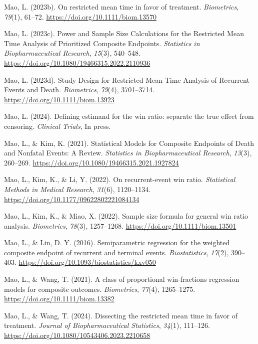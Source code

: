 \documentclass[
  letterpaper,
  DIV=11,
  numbers=noendperiod]{scrreprt}
\newlength{\cslhangindent}
\newlength{\cslentryspacingunit} %
\newenvironment{CSLReferences}[2] %
 {%
  \setlength{\parindent}{0pt}
  \ifodd #1
  \let\oldpar\par
  \def\par{\hangindent=\cslhangindent\oldpar}
  \fi
  \setlength{\parskip}{#2\cslentryspacingunit}
 }%
 {}
\begin{document}
\begin{CSLReferences}{1}{0}
\leavevmode{}%
Mao, L. (2023b). On restricted mean time in favor of treatment.
\emph{Biometrics}, \emph{79}(1), 61--72.
\url{https://doi.org/10.1111/biom.13570}

\leavevmode{}%
Mao, L. (2023c). Power and Sample Size Calculations for the Restricted
Mean Time Analysis of Prioritized Composite Endpoints. \emph{Statistics
in Biopharmaceutical Research}, \emph{15}(3), 540--548.
\url{https://doi.org/10.1080/19466315.2022.2110936}

\leavevmode{}%
Mao, L. (2023d). Study Design for Restricted Mean Time Analysis of
Recurrent Events and Death. \emph{Biometrics}, \emph{79}(4), 3701--3714.
\url{https://doi.org/10.1111/biom.13923}

\leavevmode{}%
Mao, L. (2024). Defining estimand for the win ratio: separate the true
effect from censoring. \emph{Clinical Trials}, In press.

\leavevmode{}%
Mao, L., \& Kim, K. (2021). Statistical Models for Composite Endpoints
of Death and Nonfatal Events: A Review. \emph{Statistics in
Biopharmaceutical Research}, \emph{13}(3), 260--269.
\url{https://doi.org/10.1080/19466315.2021.1927824}

\leavevmode{}%
Mao, L., Kim, K., \& Li, Y. (2022). On recurrent-event win ratio.
\emph{Statistical Methods in Medical Research}, \emph{31}(6),
1120--1134. \url{https://doi.org/10.1177/09622802221084134}

\leavevmode{}%
Mao, L., Kim, K., \& Miao, X. (2022). Sample size formula for general
win ratio analysis. \emph{Biometrics}, \emph{78}(3), 1257--1268.
\url{https://doi.org/10.1111/biom.13501}

\leavevmode{}%
Mao, L., \& Lin, D. Y. (2016). Semiparametric regression for the
weighted composite endpoint of recurrent and terminal events.
\emph{Biostatistics}, \emph{17}(2), 390--403.
\url{https://doi.org/10.1093/biostatistics/kxv050}

\leavevmode{}%
Mao, L., \& Wang, T. (2021). A class of proportional win{-}fractions
regression models for composite outcomes. \emph{Biometrics},
\emph{77}(4), 1265--1275. \url{https://doi.org/10.1111/biom.13382}

\leavevmode{}%
Mao, L., \& Wang, T. (2024). Dissecting the restricted mean time in
favor of treatment. \emph{Journal of Biopharmaceutical Statistics},
\emph{34}(1), 111--126.
\url{https://doi.org/10.1080/10543406.2023.2210658}


\end{CSLReferences}
\end{document}
